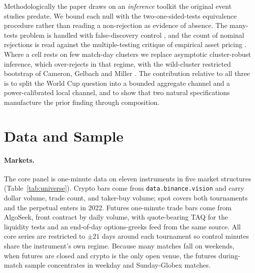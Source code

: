 \documentclass[12pt]{article}
\begin{document}
Methodologically the paper draws on an \emph{inference} toolkit the original event studies predate. We bound each
null with the two-one-sided-tests equivalence procedure \cite{lakens2017} rather than reading a
non-rejection as evidence of absence. The many-tests problem is handled with false-discovery control
\cite{benjamini1995}, and the count of nominal rejections is read against the multiple-testing critique of
empirical asset pricing \cite{harvey2016}. Where a cell rests on few match-day clusters we replace
asymptotic cluster-robust inference, which over-rejects in that regime, with the wild-cluster restricted
bootstrap of Cameron, Gelbach and Miller \cite{cameron2008}. The contribution relative to all three is to
split the World Cup question into a bounded aggregate channel and a power-calibrated local channel, and to
show that two natural specifications manufacture the prior finding through composition.

\section{Data and Sample}\label{sec:data}
\paragraph{Markets.} The core panel is one-minute data on eleven instruments in five market structures (Table~\ref{tab:universe}). Crypto bars come from \texttt{data.binance.vision} and carry dollar volume, trade count, and taker-buy volume; spot covers both tournaments and the perpetual enters in 2022. Futures one-minute trade bars come from AlgoSeek, front contract by daily volume, with quote-bearing TAQ for the liquidity tests and an end-of-day options-greeks feed from the same source. All core series are restricted to $\pm21$ days around each tournament so control minutes share the instrument's own regime. Because many matches fall on weekends, when futures are closed and crypto is the only open venue, the futures during-match sample concentrates in weekday and Sunday-Globex matches.
\end{document}
